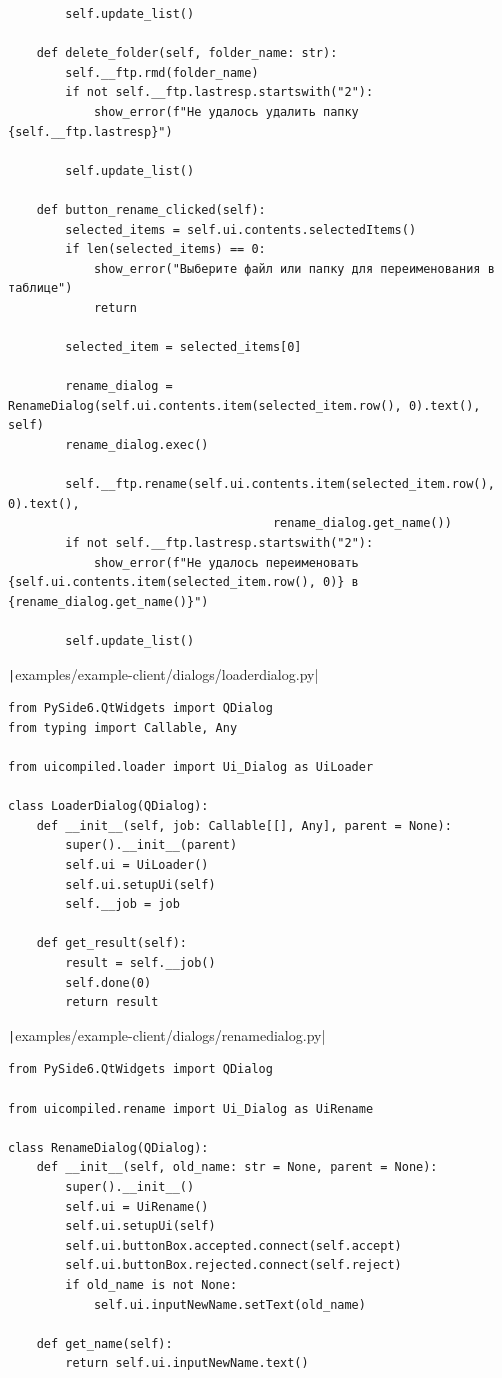 \documentclass[a4paper,14pt]{extarticle}
\begin{document}
\begin{verbatim}
        self.update_list()

    def delete_folder(self, folder_name: str):
        self.__ftp.rmd(folder_name)
        if not self.__ftp.lastresp.startswith("2"):
            show_error(f"Не удалось удалить папку {self.__ftp.lastresp}")

        self.update_list()

    def button_rename_clicked(self):
        selected_items = self.ui.contents.selectedItems()
        if len(selected_items) == 0:
            show_error("Выберите файл или папку для переименования в таблице")
            return

        selected_item = selected_items[0]

        rename_dialog = RenameDialog(self.ui.contents.item(selected_item.row(), 0).text(), self)
        rename_dialog.exec()

        self.__ftp.rename(self.ui.contents.item(selected_item.row(), 0).text(),
                                     rename_dialog.get_name())
        if not self.__ftp.lastresp.startswith("2"):
            show_error(f"Не удалось переименовать {self.ui.contents.item(selected_item.row(), 0)} в {rename_dialog.get_name()}")

        self.update_list()
\end{verbatim}
\texttt|examples/example-client/dialogs/loaderdialog.py|
\begin{verbatim}
from PySide6.QtWidgets import QDialog
from typing import Callable, Any

from uicompiled.loader import Ui_Dialog as UiLoader

class LoaderDialog(QDialog):
    def __init__(self, job: Callable[[], Any], parent = None):
        super().__init__(parent)
        self.ui = UiLoader()
        self.ui.setupUi(self)
        self.__job = job

    def get_result(self):
        result = self.__job()
        self.done(0)
        return result
\end{verbatim}
\texttt|examples/example-client/dialogs/renamedialog.py|
\begin{verbatim}
from PySide6.QtWidgets import QDialog

from uicompiled.rename import Ui_Dialog as UiRename

class RenameDialog(QDialog):
    def __init__(self, old_name: str = None, parent = None):
        super().__init__()
        self.ui = UiRename()
        self.ui.setupUi(self)
        self.ui.buttonBox.accepted.connect(self.accept)
        self.ui.buttonBox.rejected.connect(self.reject)
        if old_name is not None:
            self.ui.inputNewName.setText(old_name)

    def get_name(self):
        return self.ui.inputNewName.text()
\end{verbatim}
\end{document}

